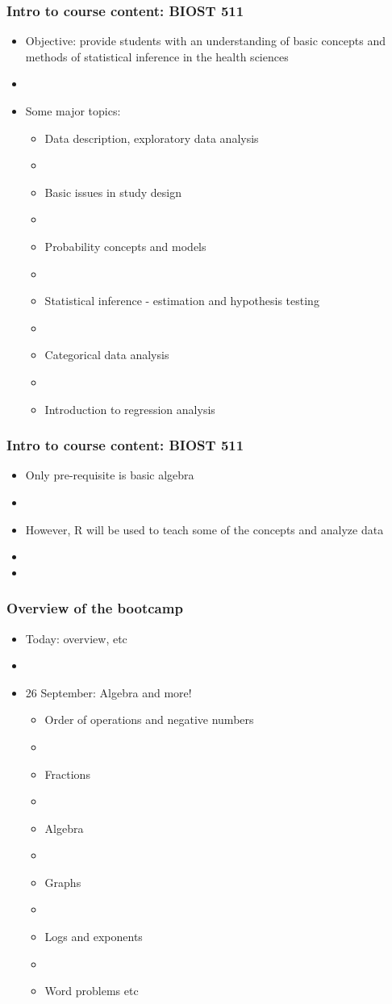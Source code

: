 \documentclass[12pt]{beamer}
\newcommand{\myframe}[1]{\begin{frame} \frametitle{#1}}
\begin{document}
\myframe{Intro to course content: BIOST 511}
\begin{itemize}
\item Objective: provide students with an understanding of basic concepts and methods of statistical inference in the health sciences
\item[]
\item Some major topics:
\begin{itemize}
\item Data description, exploratory data analysis
\item[]
\item Basic issues in study design
\item[]
\item Probability concepts and models
\item[]
\item Statistical inference - estimation and hypothesis testing
\item[]
\item Categorical data analysis
\item[]
\item Introduction to regression analysis
\end{itemize}
\end{itemize}
\end{frame}

\myframe{Intro to course content: BIOST 511}
\begin{itemize}
\item Only pre-requisite is basic algebra
\item[]
\item However, R will be used to teach some of the concepts and analyze data
\item[]
\item 
\end{itemize}
\end{frame}

\myframe{Overview of the bootcamp}
\begin{itemize}
\item Today: overview, etc
\item[]
\item 26 September: Algebra and more!
\begin{itemize}
\item Order of operations and negative numbers
\item[]
\item Fractions
\item[]
\item Algebra
\item[]
\item Graphs
\item[]
\item Logs and exponents
\item[]
\item Word problems etc
\end{itemize}
\end{itemize}
\end{frame}
\end{document}
